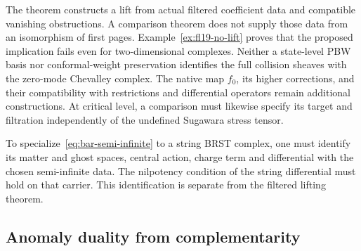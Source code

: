 \begin{remark}
\label{rem:bar-semi-infinite-scope}
The theorem constructs a lift from actual filtered coefficient data and compatible vanishing obstructions.
A comparison theorem does not supply those data from an isomorphism of first pages.
Example~\ref{ex:fl19-no-lift} proves that the proposed implication fails even for two-dimensional complexes.
Neither a state-level PBW basis nor conformal-weight preservation identifies the full collision sheaves with the zero-mode Chevalley complex.
The native map $f_0$, its higher corrections, and their compatibility with restrictions and differential operators remain additional constructions.
At critical level, a comparison must likewise specify its target and filtration independently of the undefined Sugawara stress tensor.
\end{remark}

\begin{remark}
\label{rem:string-brst-special-case}
To specialize~\eqref{eq:bar-semi-infinite} to a string BRST complex, one must identify its matter and ghost spaces, central action, charge term and differential with the chosen semi-infinite data.
The nilpotency condition of the string differential must hold on that carrier.
This identification is separate from the filtered lifting theorem.
\end{remark}

\subsection{Anomaly duality from complementarity}

